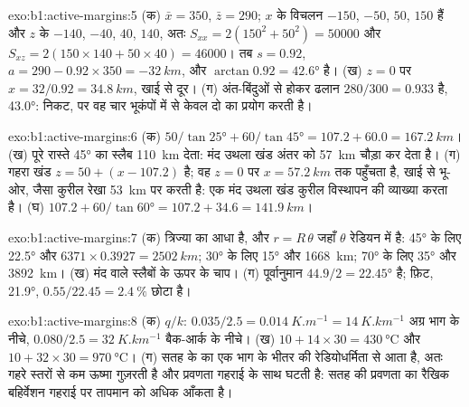 \begin{solution}{exo:b1:active-margins:5}
(क) $\bar x = 350$, $\bar z = 290$; $x$ के विचलन $-150$, $-50$, $50$, $150$ हैं और $z$ के $-140$, $-40$, $40$, $140$, अतः $S_{xx} = 2(150^2 + 50^2) = \num{50000}$ और $S_{xz} = 2(150\times140 + 50\times40) = \num{46000}$। तब $s = 0.92$, $a = 290 - 0.92\times350 = \qty{-32}{km}$, और  $\arctan 0.92 = \ang{42.6}$ है। (ख) $z = 0$ पर $x = 32/0.92 = \qty{34.8}{km}$, खाई से दूर। (ग) अंत-बिंदुओं से होकर ढलान $280/300 = 0.933$ है,  \ang{43.0}: निकट, पर वह चार भूकंपों में से केवल दो का प्रयोग करती है।
\end{solution}

\begin{solution}{exo:b1:active-margins:6}
(क) $50/\tan\ang{25} + 60/\tan\ang{45} = 107.2 + 60.0 = \qty{167.2}{km}$। (ख) पूरे रास्ते \ang{45} का स्लैब \qty{110}{km} देता: मंद उथला खंड अंतर को \qty{57}{km} चौड़ा कर देता है। (ग) गहरा खंड $z = 50 + (x - 107.2)$ है; वह $z = 0$ पर $x = \qty{57.2}{km}$ तक पहुँचता है, खाई से भू-ओर, जैसा कुरील रेखा \qty{53}{km} पर करती है: एक मंद उथला खंड कुरील विस्थापन की व्याख्या करता है। (घ) $107.2 + 60/\tan\ang{60} = 107.2 + 34.6 =
\qty{141.9}{km}$।
\end{solution}

\begin{solution}{exo:b1:active-margins:7}
(क) त्रिज्या  का आधा है, और $r = R\,\theta$ जहाँ $\theta$ रेडियन में है: \ang{45} के लिए \ang{22.5} और $6371\times0.3927 = \qty{2502}{km}$; \ang{30} के लिए \ang{15} और \qty{1668}{km}; \ang{70} के लिए \ang{35} और \qty{3892}{km}। (ख) मंद  वाले स्लैबों के ऊपर के चाप। (ग) पूर्वानुमान $44.9/2 = \ang{22.45}$ है; फ़िट, \ang{21.9}, $0.55/22.45 = \qty{2.4}{\percent}$ छोटा है।
\end{solution}

\begin{solution}{exo:b1:active-margins:8}
(क) $q/k$: $0.035/2.5 = \qty{0.014}{K.m^{-1}} = \qty{14}{K.km^{-1}}$ अग्र भाग के नीचे, $0.080/2.5 = \qty{32}{K.km^{-1}}$ बैक-आर्क के नीचे। (ख) $10 + 14\times30 = \qty{430}{\celsius}$ और $10 + 32\times30 = \qty{970}{\celsius}$। (ग) सतह के  का एक भाग  के भीतर की रेडियोधर्मिता से आता है, अतः गहरे स्तरों से कम ऊष्मा गुज़रती है और प्रवणता गहराई के साथ घटती है: सतह की प्रवणता का रैखिक बहिर्वेशन गहराई पर तापमान को अधिक आँकता है।
\end{solution}


